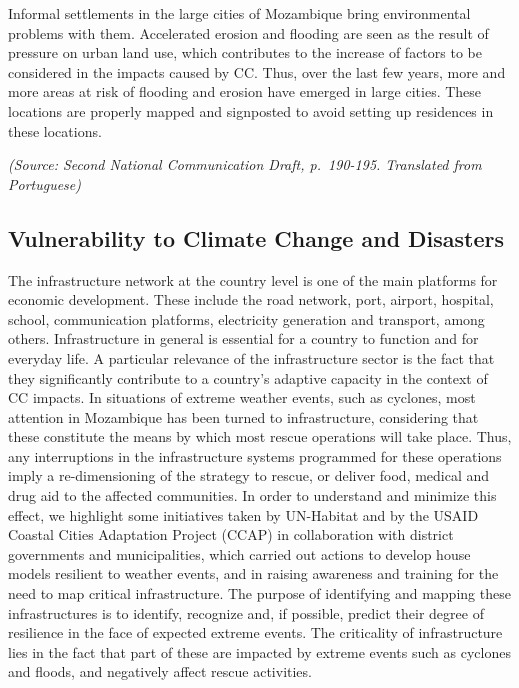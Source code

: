 \documentclass[
]{book}
\begin{document}
Informal settlements in the large cities of Mozambique bring environmental problems with them. Accelerated erosion and flooding are seen as the result of pressure on urban land use, which contributes to the increase of factors to be considered in the impacts caused by CC. Thus, over the last few years, more and more areas at risk of flooding and erosion have emerged in large cities. These locations are properly mapped and signposted to avoid setting up residences in these locations.

\emph{(Source: Second National Communication Draft, p.~190-195. Translated from Portuguese)}

\hypertarget{vulnerability-to-climate-change-and-disasters-6}{%
\subsection{Vulnerability to Climate Change and Disasters}\label{vulnerability-to-climate-change-and-disasters-6}}

The infrastructure network at the country level is one of the main platforms for economic development. These include the road network, port, airport, hospital, school, communication platforms, electricity generation and transport, among others. Infrastructure in general is essential for a country to function and for everyday life. A particular relevance of the infrastructure sector is the fact that they significantly contribute to a country's adaptive capacity in the context of CC impacts. In situations of extreme weather events, such as cyclones, most attention in Mozambique has been turned to infrastructure, considering that these constitute the means by which most rescue operations will take place. Thus, any interruptions in the infrastructure systems programmed for these operations imply a re-dimensioning of the strategy to rescue, or deliver food, medical and drug aid to the affected communities. In order to understand and minimize this effect, we highlight some initiatives taken by UN-Habitat and by the USAID Coastal Cities Adaptation Project (CCAP) in collaboration with district governments and municipalities, which carried out actions to develop house models resilient to weather events, and in raising awareness and training for the need to map critical infrastructure. The purpose of identifying and mapping these infrastructures is to identify, recognize and, if possible, predict their degree of resilience in the face of expected extreme events. The criticality of infrastructure lies in the fact that part of these are impacted by extreme events such as cyclones and floods, and negatively affect rescue activities.
\end{document}
